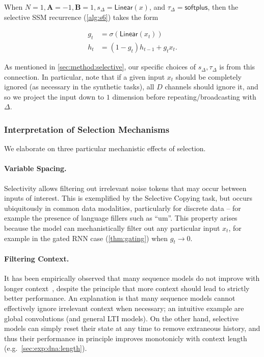 \begin{theorem}
  \label{thm:gating}
  When $N=1, \bm{A}=-1, \bm{B}=1, s_\Delta=\mathsf{Linear}(x)$, and $\tau_\Delta=\mathsf{softplus}$,
  then the selective SSM recurrence (\ref{alg:s6}) takes the form

    \begin{equation}
      \label{eq:gates}
      \begin{aligned}
        g_t &= \sigma(\mathsf{Linear}(x_t)) \\
        h_{t} &= (1-g_t) h_{t-1} + g_t x_t
        .
      \end{aligned}
    \end{equation}

\end{theorem}

As mentioned in \ref{sec:method:selective}, our specific choices of $s_\Delta, \tau_\Delta$ is from this connection. In particular, note that if a given input $x_t$ should be completely ignored (as necessary in the synthetic tasks), all $D$ channels should ignore it, and so we project the input down to $1$ dimension before repeating/broadcasting with $\Delta$.

\subsubsection{Interpretation of Selection Mechanisms}

We elaborate on three particular mechanistic effects of selection.

\paragraph{Variable Spacing.} Selectivity allows filtering out irrelevant noise tokens that may occur between inputs of interest. This is exemplified by the Selective Copying task, but occurs ubiquitously in common data modalities, particularly for discrete data -- for example the presence of language fillers such as ``um''. This property arises because the model can mechanistically filter out any particular input $x_t$, for example in the gated RNN case (\ref{thm:gating}) when $g_t \to 0$.

\paragraph{Filtering Context.} It has been empirically observed that many sequence models do not improve with longer context~\citep{shi2023large}, despite the principle that more context should lead to strictly better performance. An explanation is that many sequence models cannot effectively ignore irrelevant context when necessary; an intuitive example are global convolutions (and general LTI models). On the other hand, selective models can simply reset their state at any time to remove extraneous history, and thus their performance in principle improves monotonicly with context length (e.g.\ \ref{sec:exp:dna:length}).

